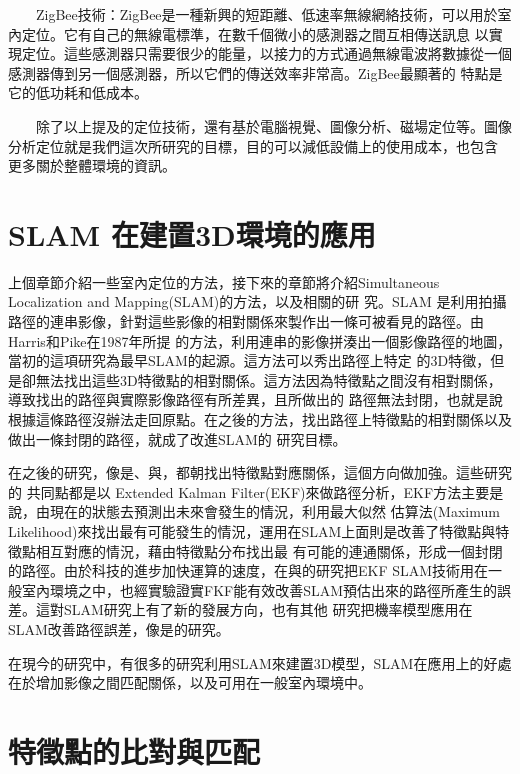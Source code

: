 　　ZigBee技術：ZigBee是一種新興的短距離、低速率無線網絡技術，可以用於室內定位。它有自己的無線電標準，在數千個微小的感測器之間互相傳送訊息
以實現定位。這些感測器只需要很少的能量，以接力的方式通過無線電波將數據從一個感測器傳到另一個感測器，所以它們的傳送效率非常高。ZigBee最顯著的
特點是它的低功耗和低成本。

　　除了以上提及的定位技術，還有基於電腦視覺、圖像分析、磁場定位等。圖像分析定位就是我們這次所研究的目標，目的可以減低設備上的使用成本，也包含
更多關於整體環境的資訊。


\section{SLAM 在建置3D環境的應用}

	上個章節介紹一些室內定位的方法，接下來的章節將介紹Simultaneous Localization and Mapping(SLAM)的方法，以及相關的研
究。SLAM 是利用拍攝路徑的連串影像，針對這些影像的相對關係來製作出一條可被看見的路徑。由Harris和Pike在1987年所提
\cite{Harris198887}的方法，利用連串的影像拼湊出一個影像路徑的地圖，當初的這項研究為最早SLAM的起源。這方法可以秀出路徑上特定
的3D特徵，但是卻無法找出這些3D特徵點的相對關係。這方法因為特徵點之間沒有相對關係，導致找出的路徑與實際影像路徑有所差異，且所做出的
路徑無法封閉，也就是說根據這條路徑沒辦法走回原點。在之後的方法，找出路徑上特徵點的相對關係以及做出一條封閉的路徑，就成了改進SLAM的
研究目標。

	在之後的研究，像是\cite{174711}、\cite{1087373}與\cite{Smith1988}，都朝找出特徵點對應關係，這個方向做加強。這些研究的
共同點都是以 Extended Kalman Filter(EKF)來做路徑分析，EKF方法主要是說，由現在的狀態去預測出未來會發生的情況，利用最大似然
估算法(Maximum Likelihood)來找出最有可能發生的情況，運用在SLAM上面則是改善了特徵點與特徵點相互對應的情況，藉由特徵點分布找出最
有可能的連通關係，形成一個封閉的路徑。由於科技的進步加快運算的速度，在\cite{Betge1996}與\cite{Davison2001}的研究把EKF 
SLAM技術用在一般室內環境之中，也經實驗證實FKF能有效改善SLAM預估出來的路徑所產生的誤差。這對SLAM研究上有了新的發展方向，也有其他
研究把機率模型應用在SLAM改善路徑誤差，像是\cite{Durrant2003}的研究。

	在現今的研究中，有很多的研究利用SLAM來建置3D模型，SLAM在應用上的好處在於增加影像之間匹配關係，以及可用在一般室內環境中。


\section{特徵點的比對與匹配}

